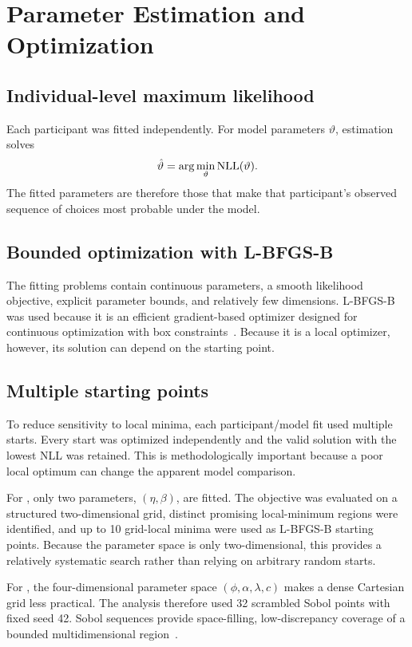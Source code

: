 \section{Parameter Estimation and Optimization}
\subsection{Individual-level maximum likelihood}

Each participant was fitted independently. For model parameters \(\vartheta\), estimation solves
\begin{equation}
    \hat{\vartheta}=\arg\min_{\vartheta}\operatorname{NLL}(\vartheta).
\end{equation}
The fitted parameters are therefore those that make that participant's observed sequence of choices most probable under the model.

\subsection{Bounded optimization with L-BFGS-B}

The fitting problems contain continuous parameters, a smooth likelihood objective, explicit parameter bounds, and relatively few dimensions. L-BFGS-B was used because it is an efficient gradient-based optimizer designed for continuous optimization with box constraints~\cite{byrd1995}. Because it is a local optimizer, however, its solution can depend on the starting point.

\subsection{Multiple starting points}

To reduce sensitivity to local minima, each participant/model fit used multiple starts. Every start was optimized independently and the valid solution with the lowest NLL was retained. This is methodologically important because a poor local optimum can change the apparent model comparison.

For \QL{}, only two parameters, \((\eta,\beta)\), are fitted. The objective was evaluated on a structured two-dimensional grid, distinct promising local-minimum regions were identified, and up to 10 grid-local minima were used as L-BFGS-B starting points. Because the parameter space is only two-dimensional, this provides a relatively systematic search rather than relying on arbitrary random starts.

For \PVL{}, the four-dimensional parameter space \((\phi,\alpha,\lambda,c)\) makes a dense Cartesian grid less practical. The analysis therefore used 32 scrambled Sobol points with fixed seed 42. Sobol sequences provide space-filling, low-discrepancy coverage of a bounded multidimensional region~\cite{sobol1967}.

